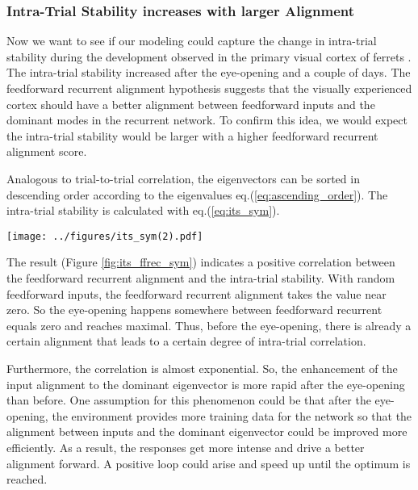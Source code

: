 \documentclass[11pt]{article}
\begin{document}
	\subsubsection{Intra-Trial Stability increases with larger Alignment}
	
	Now we want to see if our modeling could capture the change in intra-trial stability during the development observed in the primary visual cortex of ferrets \cite{tragenap2023nature}. The intra-trial stability increased after the eye-opening and a couple of days. The feedforward recurrent alignment hypothesis suggests that the visually experienced cortex should have a better alignment between feedforward inputs and the dominant modes in the recurrent network. To confirm this idea, we would expect the intra-trial stability would be larger with a higher feedforward recurrent alignment score. 
	
	Analogous to trial-to-trial correlation, the eigenvectors can be sorted in descending order according to the eigenvalues eq.(\ref{eq:ascending_order}). The intra-trial stability is calculated with eq.(\ref{eq:its_sym}).

	\begin{SCfigure}[0.9][h] 
		\centering
		\caption[Correlation between feedforward recurrent alignment and intra-trial stability for symmetric RNNs]{\textbf{Correlation between feedforward recurrent alignment and intra-trial stability for symmetric RNNs.} Inputs aligned to eigenvectors $e_i$ of interaction matrix $J$ sorted according to the ascending order of eigenvalues eq.(\ref{eq:ascending_order}), resulting the feedforward recurrent alignment varies approximately between $\lambda_{\text{min}}$ and $\lambda_{\text{max}}$. For one input aligned to an eigenvector, the intra-trial stability is calculated with the evoked steady-state response eq.(\ref{eq:its_sym}).}
		\texttt{[image: ../figures/its\_sym(2).pdf]}
		\label{fig:its_ffrec_sym}
	\end{SCfigure}

	The result (Figure \ref{fig:its_ffrec_sym}) indicates a positive correlation between the feedforward recurrent alignment and the intra-trial stability. With random feedforward inputs, the feedforward recurrent alignment takes the value near zero. So the eye-opening happens somewhere between feedforward recurrent equals zero and reaches maximal. Thus, before the eye-opening, there is already a certain alignment that leads to a certain degree of intra-trial correlation. 
	
	Furthermore, the correlation is almost exponential. So, the enhancement of the input alignment to the dominant eigenvector is more rapid after the eye-opening than before. One assumption for this phenomenon could be that after the eye-opening, the environment provides more training data for the network so that the alignment between inputs and the dominant eigenvector could be improved more efficiently. As a result, the responses get more intense and drive a better alignment forward. A positive loop could arise and speed up until the optimum is reached. 
	
\end{document}
